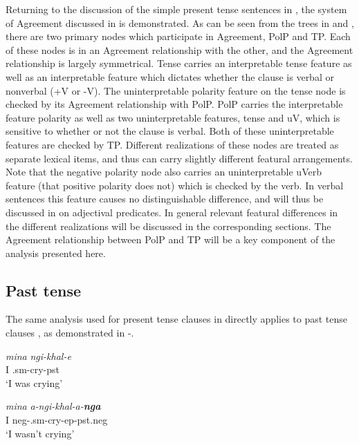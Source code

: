 \documentclass[output=paper]{langsci/langscibook}
\begin{document}
Returning to the discussion of the simple present tense sentences in , the system of Agreement discussed in  is demonstrated. As can be seen from the trees in  and , there are two primary nodes which participate in Agreement, PolP and TP. Each of these nodes is in an Agreement relationship with the other, and the Agreement relationship is largely symmetrical. Tense carries an interpretable tense feature as well as an interpretable feature which dictates whether the clause is verbal or nonverbal (+V or -V). The uninterpretable polarity feature on the tense node is checked by its Agreement relationship with PolP. PolP carries the interpretable feature polarity as well as two uninterpretable features, tense and uV, which is sensitive to whether or not the clause is verbal. Both of these uninterpretable features are checked by TP. Different realizations of these nodes are treated as separate lexical items, and thus can carry slightly different featural arrangements. Note that the negative polarity node also carries an uninterpretable uVerb feature (that positive polarity does not) which is checked by the verb. In verbal sentences this feature causes no distinguishable difference, and will thus be discussed in  on adjectival predicates. In general relevant featural differences in the different realizations will be discussed in the corresponding sections. The Agreement relationship between PolP and TP will be a key component of the analysis presented here.


\subsection{Past tense}

The same analysis used for present tense clauses in  directly applies to past tense clauses , as demonstrated in -.



\begin{exe}
\ex\label{ex:burkholder:9} \begin{xlist}
\ex\label{ex:burkholder:9a} \gll \textit{mina} \textit{ngi-khal-e}\\
         I .{\sc sm}-cry-{\sc pst}\\
    \glt `I was crying'

\ex\label{ex:burkholder:9b} \gll \textit{mina} \textit{a-ngi-khal-a-\textbf{nga}}\\
         I {\sc neg}-.{\sc sm}-cry-{\sc ep}-{\sc pst.neg}\\
    \glt `I wasn't crying'
\end{xlist}
\end{exe}
\end{document}
